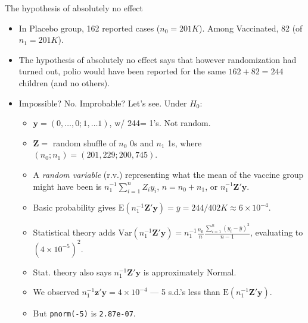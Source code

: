 \begin{frame}{The hypothesis of absolutely no effect}

  \begin{itemize}
  \item In Placebo group, 162 reported cases ($n_{0}=201K$).  Among
    Vaccinated, 82 (of $n_{1}=201K$).
   \item The hypothesis of absolutely no effect says that however
     randomization had turned out, polio would have
     been reported for the same $162 +
     82 = 244$ children (and no others).
   \item Impossible?  No.  Improbable?  Let's see.  Under $H_{0}$:
     \begin{itemize}
     \item $\mathbf{y} = (0, \ldots, 0; 1, \ldots 1)$, w/ 244= 1's.
       Not random. 
     \item $\mathbf{Z} =$ random shuffle of $n_{0}$ 0s and $n_{1}$
      1s, where $(n_{0}; n_{1}) = (201,229 ; 200,745)$.  
     \item A \textit{random variable}  (r.v.) representing what the mean of
       the vaccine group might have been is 
       $n_{1}^{-1}\sum_{i=1}^{n} Z_{i}y_{i}$, $n = n_{0} + n_{1}$, or
       $n_{1}^{-1}\mathbf{Z}'\mathbf{y}$.
     \item Basic probability gives
       $\mathrm{E}(n_{1}^{-1}\mathbf{Z}'\mathbf{y}) = \bar y =
       244/402K \approx 6\times 10^{-4}$. 
     \item Statistical theory
       adds $\mathrm{Var}(n_{1}^{-1}\mathbf{Z}'\mathbf{y}) = n_{1}^{-1}
  \frac{n_{0}}{n} \frac{\sum_{i=1}^{n} (y_{i} - \bar
    y)^{2}}{n-1}$, evaluating to
  $\left(4\times 10^{-5}\right)^{2}$.
     \item Stat. theory also says $n_{1}^{-1}\mathbf{Z}'\mathbf{y}$ is
       approximately Normal.
     \item We observed $n_{1}^{-1}\mathbf{z}'\mathbf{y} =4 \times
       10^{-4}$ --- 5 s.d.'s less than
       $\mathrm{E}(n_{1}^{-1}\mathbf{Z}'\mathbf{y})$.  
     \item But \texttt{pnorm(-5)} is \texttt{2.87e-07}.
     \end{itemize}
  \end{itemize}
  \end{frame}



